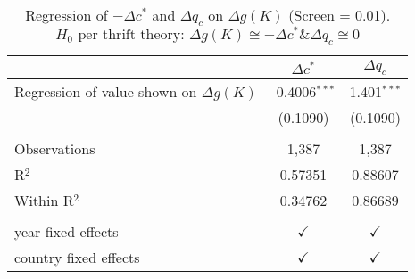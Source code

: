 \begin{table}[pos=h]
\caption{Regression of $- \Delta c^*$ and $\Delta q_c$ on $\Delta g(K)$ (Screen = 0.01). $H_0 \text{ per thrift theory: } \Delta g(K) \cong -\Delta c^* \& \Delta q_c \cong 0$}
\centering
\begin{tabularx}{\columnwidth}{lcc}
   \toprule
                                               & $\Delta c^*$    & $\Delta q_c$ \\    
   \midrule 
   Regression of value shown on $\Delta g(K)$  & -0.4006$^{***}$ & 1.401$^{***}$\\   
                                               & (0.1090)        & (0.1090)\\   
    \\
   Observations                                & 1,387           & 1,387\\  
   R$^2$                                       & 0.57351         & 0.88607\\  
   Within R$^2$                                & 0.34762         & 0.86689\\  
    \\
   year fixed effects                          & $\checkmark$    & $\checkmark$\\   
   country fixed effects                       & $\checkmark$    & $\checkmark$\\   
   \bottomrule
\end{tabularx}
   \label{tbl-wid_c_table}
\end{table}